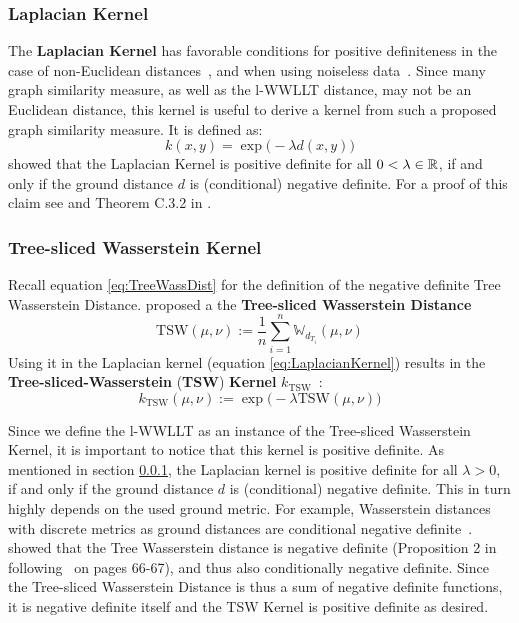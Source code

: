 	\subsubsection{Laplacian Kernel} \label{subsec:def_LaplacianKernel}
		
		The \textbf{Laplacian Kernel} has favorable conditions for positive definiteness in the case of non-Euclidean distances~\cite{1984_Berg_BOOK, 2015_Feragen_IEEE}, and when using noiseless data~\cite{2015_Rupp_CONF}.
		Since many graph similarity measure, as well as the l-WWLLT distance, may not be an Euclidean distance, this kernel is useful to derive a kernel from such a proposed graph similarity measure.
		It is defined as:		
		\begin{equation}\label{eq:LaplacianKernel}
		k(x,y) = \exp\big( -\lambda d(x,y) \big)
		\end{equation}
		\citeauthor{1938_Schoenberg_CONF} showed that the Laplacian Kernel is positive definite for all $0<\lambda\in\mathbb{R}$, if and only if the ground distance $d$ is (conditional) negative definite.
		For a proof of this claim see \cite{1938_Schoenberg_CONF} and Theorem C.3.2 in \cite{2017_Bollobas_BOOK}.
	
	\subsubsection{Tree-sliced Wasserstein Kernel} \label{sec:def_TSWKernel}
	
		Recall equation \ref{eq:TreeWassDist} for the definition of the negative definite Tree Wasserstein Distance.
		\citeauthor{2019_Le_NIPS} proposed a the \textbf{Tree-sliced Wasserstein Distance} %
		\begin{equation} \label{eq:TreeSlicedWassersteinDistance}
			\text{TSW}(\mu, \nu) := \frac{1}{n}\sum_{i=1}^{n}\mathbb{W}_{d_{T_i}}(\mu, \nu)
		\end{equation}
		Using it in the Laplacian kernel (equation \ref{eq:LaplacianKernel}) results in the \textbf{Tree-sliced-Wasserstein} (\textbf{TSW}) \textbf{Kernel} $k_{\text{TSW}}$~\cite{2019_Le_NIPS}:
		\[ k_{\text{TSW}}(\mu, \nu) := \exp\big( -\lambda \text{TSW}(\mu, \nu) \big) \]
		
		Since we define the l-WWLLT as an instance of the Tree-sliced Wasserstein Kernel, it is important to notice that this kernel is positive definite.		
		As mentioned in section \ref{subsec:def_LaplacianKernel}, the Laplacian kernel is positive definite for all $\lambda>0$, if and only if the ground distance $d$ is (conditional) negative definite.		
		This in turn highly depends on the used ground metric.
		For example, Wasserstein distances with discrete metrics as ground distances are conditional negative definite~\cite{2018_Gardner_IEEE}. 		
		\citeauthor{2019_Le_NIPS} showed that the Tree Wasserstein distance is negative definite (Proposition 2 in ~\cite{2019_Le_NIPS} following~\cite{1984_Berg_BOOK} on pages 66-67), 		
		and thus also conditionally negative definite.
		Since the Tree-sliced Wasserstein Distance is thus a sum of negative definite functions, it is negative definite itself and the TSW Kernel is positive definite as desired.
		
